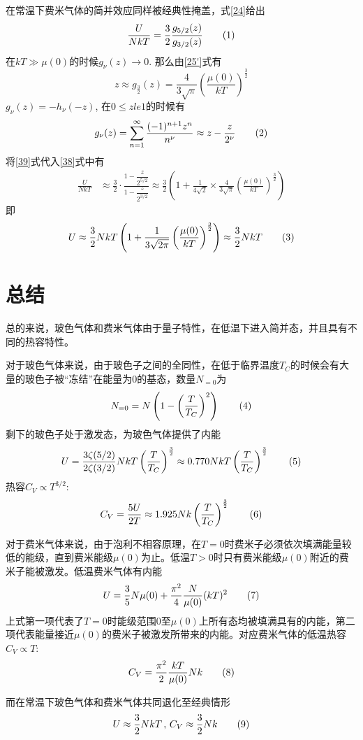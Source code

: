 \documentclass[]{article}
\begin{document}
	在常温下费米气体的简并效应同样被经典性掩盖，式\eqref{24}给出
	\[\label{38}\frac{U}{NkT}=\frac 32\frac{g_{5/2}(z)}{g_{3/2}(z)}\taghere\]
	在$ kT\gg\mu(0)  $的时候$ g_\nu(z)\to 0 $. 那么由\eqref{25'}式有
	\[z\approx g_{\frac 32}(z)=\frac{4}{3\sqrt{\pi}}\left(\frac{\mu(0)}{kT}\right)^{\frac 32}\]
	$ g_\nu(z)=-h_\nu(-z) $, 在$ 0\le zle 1 $的时候有
	\[\label{39}g_\nu(z)=\sum_{n=1}^{\infty}\frac{(-1)^{n+1}z^n}{n^\nu}\approx z-\frac{z}{2^\nu}\taghere\]
	将\eqref{39}式代入\eqref{38}式中有
	\begin{align*}
	\frac{U}{NkT}&\approx\frac 32\cdot\frac{1-\dfrac{z}{2^{5/2}}}{1-\dfrac{z}{2^{3/2}}}\approx\frac 32\left(1+\frac{1}{4\sqrt{2}}\times\frac{4}{3\sqrt{\pi}}\left(\frac{\mu(0)}{kT}\right)^{\frac 32}\right)
	\end{align*}
	即\[U\approx\frac 32NkT\left(1+\frac{1}{3\sqrt{2\pi}}\left(\frac{\mu(0)}{kT}\right)^{\frac 32}\right)\approx\frac 32NkT\taghere\]
	\newpage
	\section{总结}
	总的来说，玻色气体和费米气体由于量子特性，在低温下进入简并态，并且具有不同的热容特性。
	
	对于玻色气体来说，由于玻色子之间的全同性，在低于临界温度$ T_C $的时候会有大量的玻色子被“冻结”在能量为0的基态，数量$ N_{=0} $为
	\[N_{=0}=N\left(1-\left(\frac{T}{T_C}\right)^2\right)\taghere\]
	剩下的玻色子处于激发态，为玻色气体提供了内能
	\[U=\frac{3\zeta(5/2)}{2\zeta(3/2)}NkT\left(\frac{T}{T_C}\right)^{\frac 32}\approx0.770NkT\left(\frac{T}{T_C}\right)^{\frac 32}\taghere\]
	热容$ C_V\propto T^{3/2} $:
	\[C_V=\frac{5U}{2T}\approx1.925Nk\left(\frac{T}{T_C}\right)^{\frac 32}\taghere\]
	
	对于费米气体来说，由于泡利不相容原理，在$ T=0 $时费米子必须依次填满能量较低的能级，直到费米能级$ \mu(0) $为止。低温$ T>0 $时只有费米能级$ \mu(0) $附近的费米子能被激发。低温费米气体有内能
	\[U=\frac 35N\mu(0)+\frac{\pi^2}{4}\frac{N}{\mu(0)}(kT)^2\taghere\]
	上式第一项代表了$ T=0 $时能级范围$ 0 $至$ \mu(0) $上所有态均被填满具有的内能，第二项代表能量接近$ \mu(0) $的费米子被激发所带来的内能。对应费米气体的低温热容$ C_V\propto T $:
	\[C_V=\frac{\pi^2}{2}\frac{kT}{\mu(0)}Nk\taghere\]
	
	而在常温下玻色气体和费米气体共同退化至经典情形
	\[U\approx\frac 32NkT\,,\,C_V\approx\frac 32Nk\taghere\]
\end{document}

